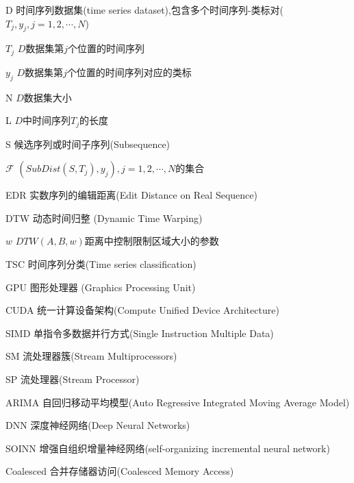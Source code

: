 \begin{denotation}[3cm]
\item[D] 时间序列数据集(time series dataset),包含多个时间序列-类标对($T_j,y_j,j=1,2,\cdots,N$)
\item[$T_j$] $D$数据集第$j$个位置的时间序列
\item[$y_j$] $D$数据集第$j$个位置的时间序列对应的类标
\item[N] $D$数据集大小
\item[L] $D$中时间序列$T_j$的长度
\item[S] 候选序列或时间子序列(Subsequence)
\item[$\mathcal{F}$] $(SubDist(S,T_j),y_j),j=1,2,\cdots,N$的集合
\item[EDR] 实数序列的编辑距离(Edit Distance on Real Sequence)
\item[DTW] 动态时间归整 (Dynamic Time Warping)
\item[$w$] $DTW(A,B,w)$距离中控制限制区域大小的参数
\item[TSC] 时间序列分类(Time series classification)
\item[GPU] 图形处理器 (Graphics Processing Unit)
\item[CUDA] 统一计算设备架构(Compute Unified Device Architecture)
\item[SIMD] 单指令多数据并行方式(Single Instruction Multiple Data)
\item[SM] 流处理器簇(Stream Multiprocessors)
\item[SP] 流处理器(Stream Processor)
\item[ARIMA] 自回归移动平均模型(Auto Regressive Integrated Moving Average Model)
\item[DNN] 深度神经网络(Deep Neural Networks)
\item[SOINN] 增强自组织增量神经网络(self-organizing incremental neural network)
\item[Coalesced] 合并存储器访问(Coalesced Memory Access)


\end{denotation}
